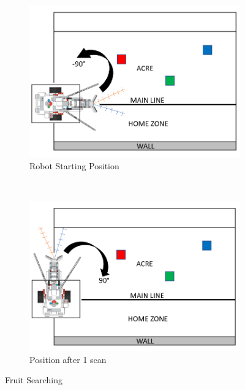 \begin{figure}[!ht]
	\centering
	\begin{subfigure}[b]{0.45\textwidth}
		\centering
		\includegraphics[width=\textwidth]{Graphics/turning90left}
		\caption{Robot Starting Position}
		\label{fig:turning90left}
	\end{subfigure}
	~
	\begin{subfigure}[b]{0.45\textwidth}
		\centering
		\includegraphics[width=\textwidth]{Graphics/turning90right}
		\caption{Position after 1 scan}
		\label{fig:turning90right}
	\end{subfigure}
	\caption{Fruit Searching}
	\vspace{-4mm}
	\label{fig:fruitScanning}
\end{figure}

